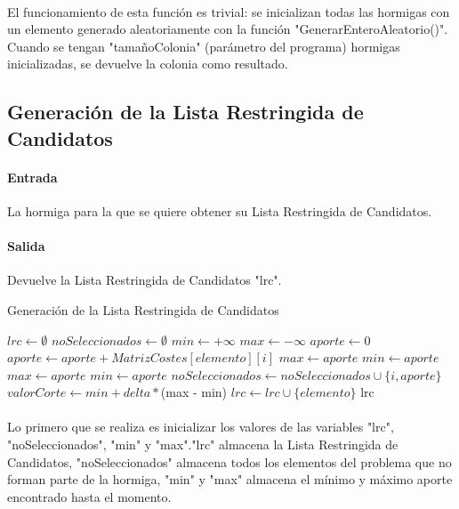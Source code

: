 	\paragraph{}El funcionamiento de esta función es trivial: se inicializan todas las hormigas con un elemento generado aleatoriamente con la función "GenerarEnteroAleatorio()". Cuando se tengan "tamañoColonia" (parámetro del programa) hormigas inicializadas, se devuelve la colonia como resultado.
	
	\subsection{Generación de la Lista Restringida de Candidatos}
	
	\paragraph{Entrada}La hormiga para la que se quiere obtener su Lista Restringida de Candidatos.
	
	\paragraph{Salida}Devuelve la Lista Restringida de Candidatos "lrc".
	
	\begin{algorithm}[H]
		\caption{Generación de la Lista Restringida de Candidatos}
		\begin{algorithmic}
			\STATE$lrc \leftarrow \emptyset$
			\STATE$noSeleccionados \leftarrow \emptyset$
			\STATE$min \leftarrow +\infty$
			\STATE$max \leftarrow -\infty$
			\STATE $aporte \leftarrow 0$
			\STATE$aporte \leftarrow aporte + MatrizCostes[elemento][i]$
			\ENDFOR
			\STATE$max \leftarrow aporte$
			\STATE$min \leftarrow aporte$
			\ENDIF
			\STATE$max \leftarrow aporte$
			\STATE$min \leftarrow aporte$
			\ENDIF
			\STATE$noSeleccionados\leftarrow noSeleccionados \cup \{i,aporte\}$
			\ENDIF
			\ENDFOR
			\STATE$valorCorte \leftarrow min + delta *$(max - min)
			\STATE$lrc \leftarrow lrc \cup {\{elemento\}}$
			\ENDIF
			\ENDFOR
			\RETURN lrc
		\end{algorithmic}
	\end{algorithm}

	\paragraph{}Lo primero que se realiza es inicializar los valores de las variables "lrc", "noSeleccionados", "min" y "max"."lrc" almacena la Lista Restringida de Candidatos, "noSeleccionados" almacena todos los elementos del problema que no forman parte de la hormiga, "min" y "max" almacena el mínimo y máximo aporte encontrado hasta el momento.
	
